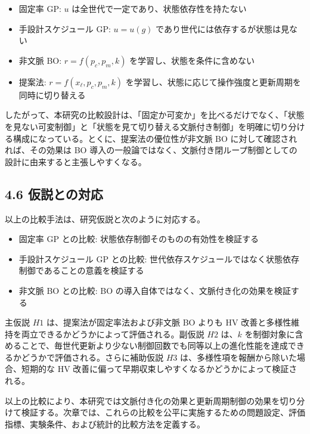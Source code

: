 \begin{itemize}
\item 固定率 GP: $u$ は全世代で一定であり、状態依存性を持たない
\item 手設計スケジュール GP: $u = u(g)$ であり世代には依存するが状態は見ない
\item 非文脈 BO: $r = f(p_c,p_m,k)$ を学習し、状態を条件に含めない
\item 提案法: $r = f(x_\ell,p_c,p_m,k)$ を学習し、状態に応じて操作強度と更新周期を同時に切り替える
\end{itemize}


したがって、本研究の比較設計は、「固定か可変か」を比べるだけでなく、「状態を見ない可変制御」と「状態を見て切り替える文脈付き制御」を明確に切り分ける構成になっている。とくに、提案法の優位性が非文脈 BO に対して確認されれば、その効果は BO 導入の一般論ではなく、文脈付き閉ループ制御としての設計に由来すると主張しやすくなる。

\subsection{4.6 仮説との対応}


以上の比較手法は、研究仮説と次のように対応する。

\begin{itemize}
\item 固定率 GP との比較: 状態依存制御そのものの有効性を検証する
\item 手設計スケジュール GP との比較: 世代依存スケジュールではなく状態依存制御であることの意義を検証する
\item 非文脈 BO との比較: BO の導入自体ではなく、文脈付き化の効果を検証する
\end{itemize}


主仮説 $H1$ は、提案法が固定率法および非文脈 BO よりも HV 改善と多様性維持を両立できるかどうかによって評価される。副仮説 $H2$ は、$k$ を制御対象に含めることで、毎世代更新より少ない制御回数でも同等以上の進化性能を達成できるかどうかで評価される。さらに補助仮説 $H3$ は、多様性項を報酬から除いた場合、短期的な HV 改善に偏って早期収束しやすくなるかどうかによって検証される。

以上の比較により、本研究では文脈付き化の効果と更新周期制御の効果を切り分けて検証する。次章では、これらの比較を公平に実施するための問題設定、評価指標、実験条件、および統計的比較方法を定義する。
